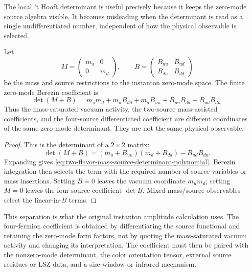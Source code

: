 The local 't Hooft determinant is useful precisely because it keeps the
zero-mode source algebra visible.  It becomes misleading when the determinant
is read as a single undifferentiated number, independent of how the physical
observable is selected.

\begin{proposition}
\label{prop:two-flavor-source-mass-determinant-coordinate}
Let
\[
  M=\begin{pmatrix}m_u&0\\0&m_d\end{pmatrix},
  \qquad
  B=\begin{pmatrix}B_{uu}&B_{ud}\\B_{du}&B_{dd}\end{pmatrix}
\]
be the mass and source restrictions to the instanton zero-mode space.  The
finite zero-mode Berezin coefficient is
\begin{equation}
  \det(M+B)
  =
  m_um_d
  +m_uB_{dd}+m_dB_{uu}
  +B_{uu}B_{dd}-B_{ud}B_{du}.
  \label{eq:two-flavor-mass-source-determinant-polynomial}
\end{equation}
Thus the mass-saturated vacuum activity, the two-source mass-assisted
coefficients, and the four-source differentiated coefficient are different
coordinates of the same zero-mode determinant.  They are not the same
physical observable.
\end{proposition}

\begin{proof}
This is the determinant of a \(2\times2\) matrix:
\[
  \det(M+B)
  =(m_u+B_{uu})(m_d+B_{dd})-B_{ud}B_{du}.
\]
Expanding gives
\eqref{eq:two-flavor-mass-source-determinant-polynomial}.  Berezin
integration then selects the term with the required number of source
variables or mass insertions.  Setting \(B=0\) leaves the vacuum coordinate
\(m_um_d\); setting \(M=0\) leaves the four-source coefficient
\(\det B\).  Mixed mass/source observables select the linear-in-\(B\)
terms.
\end{proof}

This separation is what the original instanton amplitude calculation uses.
The four-fermion coefficient is obtained by differentiating the source
functional and retaining the zero-mode form factors, not by quoting the
mass-saturated vacuum activity and changing its interpretation.  The
coefficient must then be paired with the nonzero-mode determinant, the color
orientation tensor, external source residues or LSZ data, and a size-window
or infrared mechanism.

